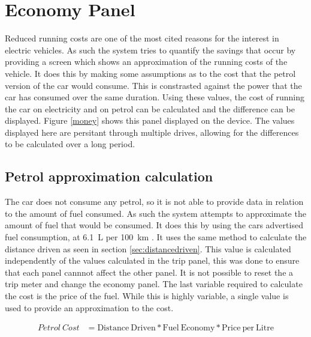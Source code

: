 

\section{Economy Panel}

Reduced running costs are one of the most cited reasons for the interest in electric vehicles. As such the system tries to quantify the savings that occur by providing a screen which shows an approximation of the running costs of the vehicle. It does this by making some assumptions as to the cost that the petrol version of the car would consume. This is constrasted against the power that the car has consumed over the same duration. Using these values, the cost of running the car on electricity and on petrol can be calculated and the difference can be displayed. Figure \ref{money} shows this panel displayed on the device. The values displayed here are persitant through multiple drives, allowing for the differences to be calculated over a long period.


\subsection{Petrol approximation calculation}

The car does not consume any petrol, so it is not able to provide data in relation to the amount of fuel consumed. As such the system attempts to approximate the amount of fuel that would be consumed. It does this by using the cars advertised fuel consumption, at 6.1~L per 100~km \cite{getz_fuel_consumption}. It uses the same method to calculate the distance driven as seen in section \ref{sec:distancedriven}. This value is calculated independently of the values calculated in the trip panel, this was done to ensure that each panel cannnot affect the other panel. It is not possible to reset the a trip meter and change the economy panel. The last variable required to calculate the cost is the price of the fuel. While this is highly variable, a single value is used to provide an approximation to the cost.

\begin{align}
\label{eq:fuelcost}
Petrol\ Cost &=\mathrm{Distance\ Driven} * \mathrm{Fuel\ Economy} *\mathrm{Price\ per\ Litre}
\end{align}

